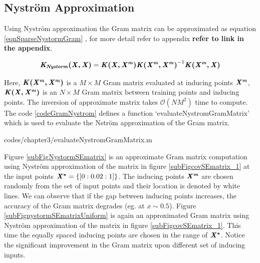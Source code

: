 \subsection{Nystr\"{o}m Approximation}\label{subSecNystrom} 

Using Nystr\"{o}m approximation the Gram matrix can be approximated as equation \ref{eqnSparseNystormGram} \cite{quinonero2005unifying, seeger2003fast}, for more detail refer to appendix \textbf{refer to link in the appendix}. 

\begin{equation}\label{eqnSparseNystormGram}
\bm{\mathit{K_{Nystorm}(X, X)}} = \bm{\mathit{K(X, X^{m})}} \bm{\mathit{K(X^{m}, X^{m})}}^{-1} \bm{\mathit{K(X^{m}, X)}}
\end{equation}

Here, $\bm{\mathit{K(X^{m}, X^{m})}}$ is a $M \times M$ Gram matrix evaluated at inducing points $\bm{\mathit{X^{m}}}$, $\bm{\mathit{K(X, X^{m})}}$ is an $N \times M$ Gram matrix between training points and inducing points. The inversion of approximate matrix takes $\mathcal{O}\left ( NM^{2} \right )$ time to compute. The code \ref{codeGramNystrom} defines a function `evaluateNystromGramMatrix' which is used to evaluate the Nstr\"{o}m approximation of the Gram matrix. 

\begin{mdframed}[hidealllines=true,backgroundcolor=lightgray!20]

                    {codes/chapter3/evaluateNystromGramMatrix.m}
\end{mdframed}


Figure \ref{subFigNystormSEmatrix} is an approximate Gram matrix computation using Nystr\"{o}m approximation of the matrix in figure \ref{subFigcovSEmatrix_1} at the input points $\bm{\mathit{X^{*}}} = \{[0:0.02:1]\}$. The inducing points $\bm{\mathit{X^{m}}}$ are chosen randomly from the set of input points and their location is denoted by white lines. We can observe that if the gap between inducing points increases, the accuracy of the Gram matrix degrades (eg. at $x \sim 0.5$). Figure \ref{subFignystormSEmatrixUniform} is again an approximated Gram matrix using Nystr\"{o}m approximation of the matrix in figure \ref{subFigcovSEmatrix_1}. This time the equally spaced inducing points are chosen in the range of $\bm{\mathit{X^{*}}}$. Notice the significant improvement in the Gram matrix upon different set of inducing inputs.


